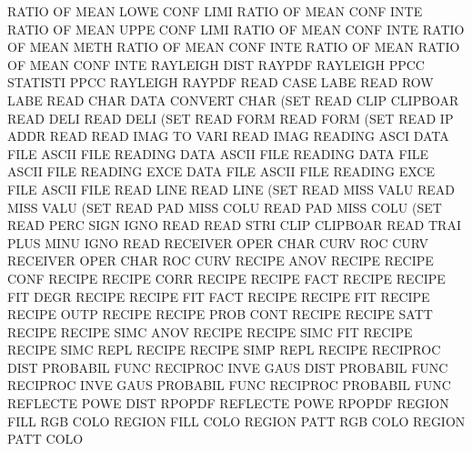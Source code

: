 RATIO    OF   MEAN LOWE CONF LIMI       RATIO    OF   MEAN CONF INTE
RATIO    OF   MEAN UPPE CONF LIMI       RATIO    OF   MEAN CONF INTE
RATIO    OF   MEAN METH                 RATIO    OF   MEAN CONF INTE
RATIO    OF   MEAN                      RATIO    OF   MEAN CONF INTE
RAYLEIGH DIST                           RAYPDF
RAYLEIGH PPCC                           STATISTI PPCC
RAYLEIGH                                RAYPDF
READ     CASE LABE                      READ     ROW  LABE
READ     CHAR DATA                      CONVERT  CHAR (SET
READ     CLIP                           CLIPBOAR
READ     DELI                           READ     DELI (SET
READ     FORM                           READ     FORM (SET
READ     IP   ADDR                      READ
READ     IMAG TO   VARI                 READ     IMAG
READING  ASCI DATA FILE                 ASCII    FILE
READING  DATA                           ASCII    FILE
READING  DATA FILE                      ASCII    FILE
READING  EXCE DATA FILE                 ASCII    FILE
READING  EXCE FILE                      ASCII    FILE
READ     LINE                           READ     LINE (SET
READ     MISS VALU                      READ     MISS VALU (SET
READ     PAD  MISS COLU                 READ     PAD  MISS COLU (SET
READ     PERC SIGN IGNO                 READ
READ     STRI CLIP                      CLIPBOAR
READ     TRAI PLUS MINU IGNO            READ
RECEIVER OPER CHAR CURV                 ROC      CURV
RECEIVER OPER CHAR                      ROC      CURV
RECIPE   ANOV                           RECIPE
RECIPE   CONF                           RECIPE
RECIPE   CORR                           RECIPE
RECIPE   FACT                           RECIPE
RECIPE   FIT  DEGR                      RECIPE
RECIPE   FIT  FACT                      RECIPE
RECIPE   FIT                            RECIPE
RECIPE   OUTP                           RECIPE
RECIPE   PROB CONT                      RECIPE
RECIPE   SATT                           RECIPE
RECIPE   SIMC ANOV                      RECIPE
RECIPE   SIMC FIT                       RECIPE
RECIPE   SIMC REPL                      RECIPE
RECIPE   SIMP REPL                      RECIPE
RECIPROC DIST                           PROBABIL FUNC
RECIPROC INVE GAUS DIST                 PROBABIL FUNC
RECIPROC INVE GAUS                      PROBABIL FUNC
RECIPROC                                PROBABIL FUNC
REFLECTE POWE DIST                      RPOPDF
REFLECTE POWE                           RPOPDF
REGION   FILL RGB  COLO                 REGION   FILL COLO
REGION   PATT RGB  COLO                 REGION   PATT COLO
